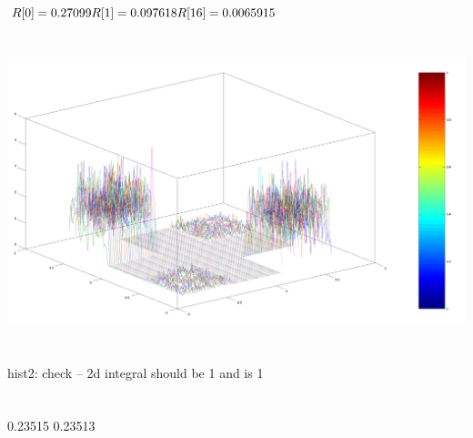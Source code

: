 \documentclass[a4paper,12pt,twocolumn]{article}
\begin{document}
\section{}
$R[0] = 0.27099 \\
R[1] = 0.097618 \\
R[16] = 0.0065915$
\section{}
\includegraphics[width=\linewidth]{12}
\section{}
hist2: check -- 2d integral should be 1 and is 1
\section{}
0.23515 0.23513
\end{document}
